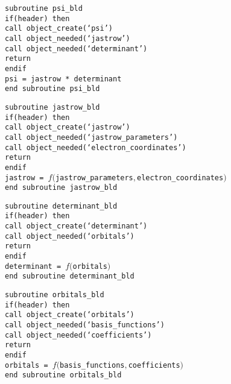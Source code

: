 \documentclass[a4paper,11pt]{article}
\begin{document}
\vspace{0.5cm}
\noindent
{\tt subroutine psi\_bld\\
if(header) then\\
\phantom{xx} call object\_create(`psi')\\
\phantom{xx} call object\_needed(`jastrow')\\
\phantom{xx} call object\_needed(`determinant')\\
\phantom{xx} return\\
endif\\
psi = jastrow * determinant\\
end subroutine psi\_bld}

\vspace{0.5cm}
\noindent
{\tt subroutine jastrow\_bld\\
if(header) then\\
\phantom{xx} call object\_create(`jastrow')\\
\phantom{xx} call object\_needed(`jastrow\_parameters')\\
\phantom{xx} call object\_needed(`electron\_coordinates')\\
\phantom{xx} return\\
endif\\
jastrow  = $f(${\tt jastrow\_parameters}$,${\tt electron\_coordinates}$)$\\
end subroutine jastrow\_bld}

\vspace{0.5cm}
\noindent
{\tt subroutine determinant\_bld\\
if(header) then\\
\phantom{xx} call object\_create(`determinant')\\
\phantom{xx} call object\_needed(`orbitals')\\
\phantom{xx} return\\
endif\\
determinant  = $f(${\tt orbitals}$)$\\
end subroutine determinant\_bld}

\vspace{0.5cm}
\noindent
{\tt subroutine orbitals\_bld\\
if(header) then\\
\phantom{xx} call object\_create(`orbitals')\\
\phantom{xx} call object\_needed(`basis\_functions')\\
\phantom{xx} call object\_needed(`coefficients')\\
\phantom{xx} return\\
endif\\
orbitals  = $f(${\tt basis\_functions}$,${\tt coefficients}$)$\\
end subroutine orbitals\_bld}
\end{document}
